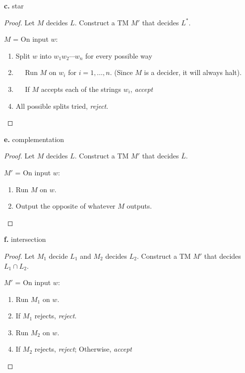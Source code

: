 \textbf{c.} star

\begin{mdframed}
\begin{proof}
Let $M$ decides $L$. Construct a TM $M'$ that decides $L^*$.

$M$ = On input $w$:
\begin{enumerate}
\item Split $w$ into $w_1 w_2 \cdots w_n$ for every possible way
\item $\quad$ Run $M$ on $w_i$ for $i = 1, \ldots, n$. (Since $M$ is a decider, it will always halt).
\item $\quad$ If $M$ accepts each of the strings $w_i$, \textit{accept}
\item All possible splits tried, \textit{reject}.
\end{enumerate}
\end{proof}
\end{mdframed}

\textbf{e.} complementation

\begin{mdframed}
\begin{proof}
Let $M$ decides $L$. Construct a TM $M'$ that decides $\overline{L}$.

$M'$ = On input $w$:
\begin{enumerate}
\item Run $M$ on $w$.
\item Output the opposite of whatever $M$ outputs.
\end{enumerate}
\end{proof}
\end{mdframed}

\textbf{f.} intersection 
\begin{mdframed}
\begin{proof}
Let $M_1$ decide $L_1$ and $M_2$ decides $L_2$. Construct a TM $M'$ that decides $L_1 \cap L_2$.

$M'$ = On input $w$:
\begin{enumerate}
\item Run $M_1$ on $w$.
\item If $M_1$ rejects, \textit{reject}.
\item Run $M_2$ on $w$.
\item If $M_2$ rejects, \textit{reject}; Otherwise, \textit{accept}
\end{enumerate}
\end{proof}
\end{mdframed}

